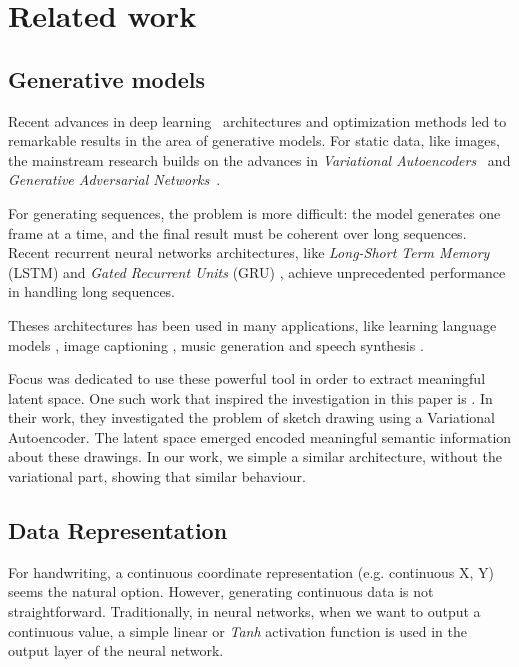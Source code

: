 \documentclass[conference]{IEEEtran}
\begin{document}
\section{Related work}

\subsection{Generative models}
\par Recent advances in deep learning~\cite{Goodfellow-et-al-2016} architectures and optimization methods led to remarkable results in the area of generative models. 
For static data, like images, the mainstream research builds on the advances in \textit{Variational Autoencoders}~\cite{kingma2013auto} and \textit{Generative Adversarial Networks}~\cite{goodfellow2014generative}.

For generating sequences, the problem is more difficult: the model generates one frame at a time, and the final result must be coherent over long sequences. Recent recurrent neural networks architectures, like \textit{Long-Short Term Memory} (LSTM) \cite{hochreiter1997long} and \textit{Gated Recurrent Units} (GRU) \cite{cho2014learning,chung2014empirical}, achieve unprecedented performance in handling long sequences.

Theses architectures has been used in many applications, like learning language models \cite{sutskever2011generating,Sutskever:2014:SSL:2969033.2969173}, image captioning \cite{karpathy2015deep,vinyals2015show}, music generation \cite{briot2017music} and speech synthesis \cite{oord2016wavenet}.

\par Focus was dedicated to use these powerful tool in order to extract meaningful latent space. One such work that inspired the investigation in this paper is \cite{DBLP:journals/corr/HaE17}. In their work, they investigated the problem of sketch drawing \cite{quickdraw} using a Variational Autoencoder. The latent space emerged encoded meaningful semantic information about these drawings. In our work, we simple a similar architecture, without the variational part, showing that similar behaviour.

\subsection{Data Representation}
\par For handwriting, a continuous coordinate representation (e.g. continuous X, Y) seems the natural option. However, generating continuous data is not straightforward. 
Traditionally, in neural networks, when we want to output a continuous value, a simple linear or \textit{Tanh} activation function is used in the output layer of the neural network. 
\end{document}
